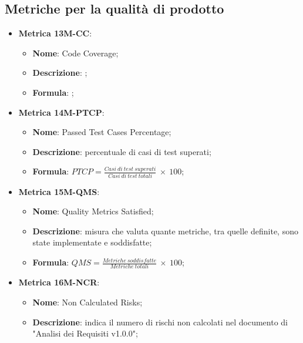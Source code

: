 \subsection{Metriche per la qualità di prodotto}
\begin{itemize}
    \item \textbf{Metrica 13M-CC}:
    \begin{itemize}
        \item \textbf{Nome}: Code Coverage;
        \item \textbf{Descrizione}: ;
        \item \textbf{Formula}: ;
    \end{itemize}
\end{itemize}

\begin{itemize}
    \item \textbf{Metrica 14M-PTCP}:
    \begin{itemize}
        \item \textbf{Nome}: Passed Test Cases Percentage;
        \item \textbf{Descrizione}: percentuale di casi di test superati;
        \item \textbf{Formula}: $PTCP = \frac{Casi\: di\: test\: superati}{Casi\: di\: test\: totali}\: \times \: 100$;
    \end{itemize}
\end{itemize}

\begin{itemize}
    \item \textbf{Metrica 15M-QMS}:
    \begin{itemize}
        \item \textbf{Nome}: Quality Metrics Satisfied;
        \item \textbf{Descrizione}: misura che valuta quante metriche, tra quelle definite, sono state implementate e soddisfatte;
        \item \textbf{Formula}: $QMS = \frac{Metriche\: soddisfatte}{Metriche\: totali}\: \times \: 100$;
    \end{itemize}
\end{itemize}

\begin{itemize}
    \item \textbf{Metrica 16M-NCR}:
    \begin{itemize}
        \item \textbf{Nome}: Non Calculated Risks;
        \item \textbf{Descrizione}: indica il numero di rischi non calcolati nel documento di "Analisi dei Requisiti v1.0.0";
    \end{itemize}
\end{itemize}

